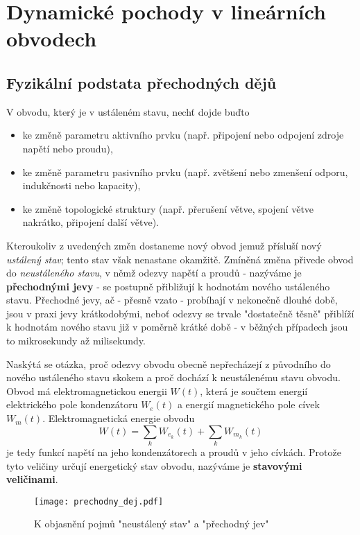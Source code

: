 \chapter[Přechodné děje]{Dynamické pochody v lineárních obvodech}
\minitoc
\newpage
  \section{Fyzikální podstata přechodných dějů}
    V obvodu, který je v ustáleném stavu, nechť dojde buďto
    \begin{itemize}
      \item ke změně parametru aktivního prvku (např. připojení nebo odpojení zdroje napětí nebo  
            proudu),
      \item ke změně parametru pasivního prvku (např. zvětšení nebo zmenšení odporu, indukčnosti  
            nebo kapacity),
      \item ke změně topologické struktury (např. přerušení větve, spojení větve nakrátko, připojení 
            další větve).
    \end{itemize}
    Kteroukoliv z uvedených změn dostaneme nový obvod jemuž přísluší nový \emph{ustálený stav}; 
    tento stav však nenastane okamžitě. Zmíněná změna přivede obvod do \emph{ne\-us\-tá\-le\-né\-ho 
    stavu}, v němž odezvy napětí a proudů - nazýváme je \textbf{přechodnými jevy} - se postupně 
    přibližují k hodnotám nového ustáleného stavu. Přechodné jevy, ač - přesně vzato - probíhají v 
    nekonečně dlouhé době, jsou v praxi jevy krátkodobými, neboť odezvy se trvale "dostatečně těsně" 
    přiblíží k hodnotám nového stavu již v poměrně krátké době - v běžných případech jsou to 
    mikrosekundy až milisekundy.

    Naskýtá se otázka, proč odezvy obvodu obecně nepřecházejí z původního do nového ustáleného stavu 
    skokem a proč dochází k neustálenému stavu obvodu. Obvod má elektromagnetickou energii $W(t)$, 
    která je součtem energií elektrického pole kondenzátoru $W_e(t)$ a energií magnetického pole 
    cívek $W_m(t)$. Elektromagnetická energie obvodu $$W(t)=\sum_kW_{e_k}(t)+\sum_kW_{m_k}(t)$$ je 
    tedy funkcí napětí na jeho kondenzátorech a proudů v jeho cívkách. Protože tyto veličiny určují 
    energetický stav obvodu, nazýváme je \textbf{stavovými veličinami}.

    \begin{figure}[ht!]
       \centering
       \texttt{[image: prechodny\_dej.pdf]}
       \caption[Přechodný jev]{K objasnění pojmů "neustálený stav" a "přechodný jev"}
       \label{TEO:fig_prechodny_dej}
    \end{figure}

